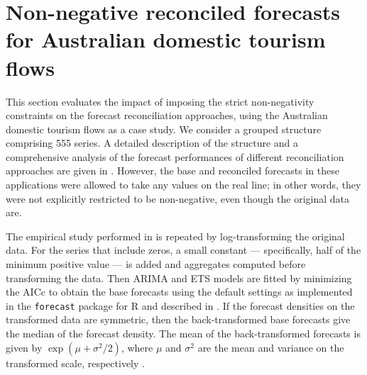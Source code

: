\documentclass[11pt]{article}
\newcommand{\0}{\phantom{0}}
\begin{document}
%
%

\section{Non-negative reconciled forecasts for Australian domestic tourism flows}
\label{sec:AUSNN}

This section evaluates the impact of imposing the strict non-negativity constraints on the forecast reconciliation approaches, using the Australian domestic tourism flows as a case study. We consider a grouped structure comprising 555 series. A detailed description of the structure and a comprehensive analysis of the forecast performances of different reconciliation approaches are given in \citet{Wick2018}. However, the base and reconciled forecasts in these applications were allowed to take any values on the real line; in other words, they were not explicitly restricted to be non-negative, even though the original data are.

The empirical study performed in \citet{Wick2018} is repeated by log-transforming the original data. For the series that include zeros, a small constant --- specifically, half of the minimum positive value --- is added and aggregates computed before transforming the data. Then ARIMA and ETS models are fitted by minimizing the AICc to obtain the base forecasts using the default settings as implemented in the \texttt{forecast} package for R \citep{forecast2016} and described in \citet{Hyndman2008}. If the forecast densities on the transformed data are symmetric, then the back-transformed base forecasts give the median of the forecast density. The mean of the back-transformed forecasts is given by $\exp\left(\mu + \sigma^2/2\right)$, where $\mu$ and $\sigma^{2}$ are the mean and variance on the transformed scale, respectively \citep[][p. 212]{Johnson1994}.
\end{document}
